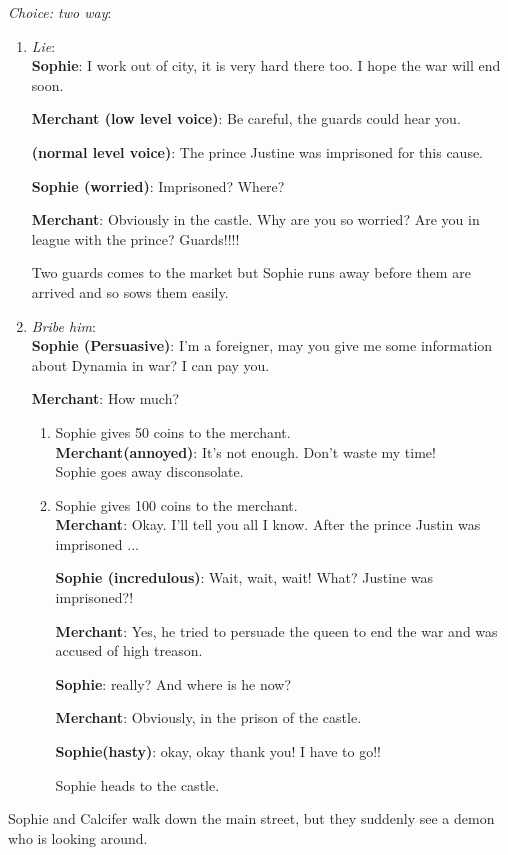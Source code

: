 \noindent \textit{Choice: two way}:
\begin{enumerate}
\item \textit{Lie}:\\
  
  \textbf{Sophie}: I work out of city, it is very hard there too. I hope the war will end soon.
  
  \textbf{Merchant (low level voice)}: Be careful, the guards could hear you.
  
  \textbf{(normal level voice)}: The prince Justine was imprisoned for this cause.
  
  \textbf{Sophie (worried)}: Imprisoned? Where? 

  \textbf{Merchant}: Obviously in the castle. Why are you so worried? Are you in league with the prince? Guards!!!!

  Two guards comes to the market but Sophie runs away before them are arrived and so sows them easily.
  
\item \textit{Bribe him}:\\
  
  \textbf{Sophie (Persuasive)}: I’m a foreigner, may you give me some information about Dynamia in war? I can pay you.
  
  \textbf{Merchant}: How much?
  
  \begin{enumerate}
  \item Sophie gives 50 coins to the merchant.\\

    \textbf{Merchant(annoyed)}: It’s not enough. Don’t waste my time!\\

    \noindent Sophie goes away disconsolate.

  \item Sophie gives 100 coins to the merchant.\\
    
    \textbf{Merchant}: Okay. I’ll tell you all I know. After the prince Justin was imprisoned ...

    \textbf{Sophie (incredulous)}: Wait, wait, wait! What? Justine was imprisoned?!
    
    \textbf{Merchant}: Yes, he tried to persuade the queen to end the war and was accused of high treason.
    
    \textbf{Sophie}: really? And where is he now?
    
    \textbf{Merchant}: Obviously, in the prison of the castle.
    
    \textbf{Sophie(hasty)}: okay, okay thank you! I have to go!!

    \noindent Sophie heads to the castle.
  \end{enumerate}
\end{enumerate}
\noindent Sophie and Calcifer walk down the main street, but they suddenly see a demon who is looking around.


